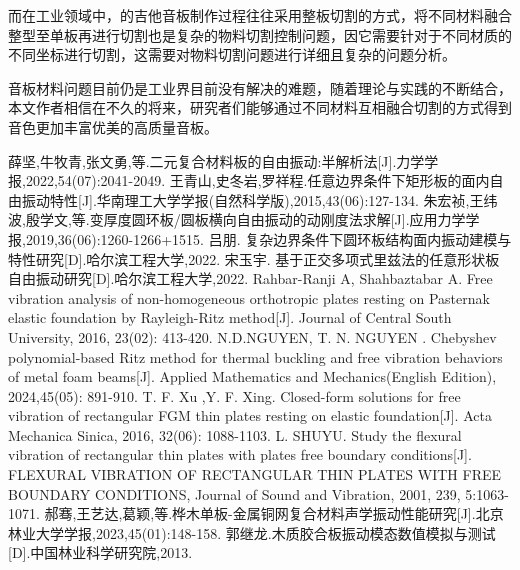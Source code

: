 \documentclass[withoutpreface,bwprint]{cumcmthesis} %
\begin{document}
而在工业领域中，的吉他音板制作过程往往采用整板切割的方式，将不同材料融合整型至单板再进行切割也是复杂的物料切割控制问题，因它需要针对于不同材质的不同坐标进行切割，这需要对物料切割问题进行详细且复杂的问题分析。

音板材料问题目前仍是工业界目前没有解决的难题，随着理论与实践的不断结合，本文作者相信在不久的将来，研究者们能够通过不同材料互相融合切割的方式得到音色更加丰富优美的高质量音板。
\newpage
\begin{thebibliography}{9}%

薛坚,牛牧青,张文勇,等.二元复合材料板的自由振动:半解析法[J].力学学报,2022,54(07):2041-2049.
王青山,史冬岩,罗祥程.任意边界条件下矩形板的面内自由振动特性[J].华南理工大学学报(自然科学版),2015,43(06):127-134.
朱宏祯,王纬波,殷学文,等.变厚度圆环板/圆板横向自由振动的动刚度法求解[J].应用力学学报,2019,36(06):1260-1266+1515.
吕朋. 复杂边界条件下圆环板结构面内振动建模与特性研究[D].哈尔滨工程大学,2022.
宋玉宇. 基于正交多项式里兹法的任意形状板自由振动研究[D].哈尔滨工程大学,2022.
Rahbar-Ranji A, Shahbaztabar A. Free vibration analysis of non-homogeneous orthotropic plates resting on Pasternak elastic foundation by Rayleigh-Ritz method[J]. Journal of Central South University, 2016, 23(02): 413-420.
N.D.NGUYEN, T. N. NGUYEN . Chebyshev polynomial-based Ritz method for thermal buckling and free vibration behaviors of metal foam beams[J]. Applied Mathematics and Mechanics(English Edition), 2024,45(05): 891-910.
T. F. Xu ,Y. F. Xing. Closed-form solutions for free vibration of rectangular FGM thin plates resting on elastic foundation[J]. Acta Mechanica Sinica, 2016, 32(06): 1088-1103.
L. SHUYU. Study the flexural vibration of rectangular thin plates with plates free boundary conditions[J]. FLEXURAL VIBRATION OF RECTANGULAR THIN PLATES WITH FREE BOUNDARY CONDITIONS, Journal of Sound and Vibration,
2001, 239, 5:1063-1071.
郝骞,王艺达,葛颖,等.桦木单板-金属铜网复合材料声学振动性能研究[J].北京林业大学学报,2023,45(01):148-158.
郭继龙.木质胶合板振动模态数值模拟与测试[D].中国林业科学研究院,2013.

\end{thebibliography}



\end{document}
